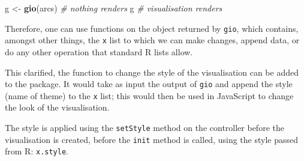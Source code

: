 \documentclass[10pt,]{krantz}
\makeatletter
\newenvironment{Shaded}{\begin{snugshade}}{\end{snugshade}}
\newcommand{\CommentTok}[1]{\textcolor[rgb]{0.37,0.37,0.37}{\textit{#1}}}
\newcommand{\ControlFlowTok}[1]{\textcolor[rgb]{0.27,0.27,0.27}{\textbf{#1}}}
\newcommand{\DataTypeTok}[1]{\textcolor[rgb]{0.27,0.27,0.27}{#1}}
\newcommand{\KeywordTok}[1]{\textcolor[rgb]{0.27,0.27,0.27}{\textbf{#1}}}
\newcommand{\NormalTok}[1]{#1}
\newcommand{\OperatorTok}[1]{\textcolor[rgb]{0.43,0.43,0.43}{\textbf{#1}}}
\newcommand{\StringTok}[1]{\textcolor[rgb]{0.5,0.5,0.5}{#1}}
\newenvironment{kframe}{%
\medskip{}
\setlength{\fboxsep}{.8em}
 \def\at@end@of@kframe{}%
 \ifinner\ifhmode%
  \def\at@end@of@kframe{\end{minipage}}%
  \begin{minipage}{\columnwidth}%
 \fi\fi%
 \def\FrameCommand##1{\hskip\@totalleftmargin \hskip-\fboxsep
 \colorbox{shadecolor}{##1}\hskip-\fboxsep
     \hskip-\linewidth \hskip-\@totalleftmargin \hskip\columnwidth}%
 \MakeFramed {\advance\hsize-\width
   \@totalleftmargin\z@ \linewidth\hsize
   \@setminipage}}%
 {\par\unskip\endMakeFramed%
 \at@end@of@kframe}
\renewenvironment{Shaded}{\begin{kframe}}{\end{kframe}}
\makeatother
\begin{document}
\begin{Shaded}
\begin{Highlighting}[]
\NormalTok{g <-}\StringTok{ }\KeywordTok{gio}\NormalTok{(arcs) }\CommentTok{# nothing renders}
\NormalTok{g }\CommentTok{# visualisation renders}
\end{Highlighting}
\end{Shaded}

Therefore, one can use functions on the object returned by \texttt{gio}, which contains, amongst other things, the \texttt{x} list to which we can make changes, append data, or do any other operation that standard R lists allow.

\begin{Shaded}
\end{Shaded}

This clarified, the function to change the style of the visualisation can be added to the package. It would take as input the output of \texttt{gio} and append the style (name of theme) to the \texttt{x} list; this would then be used in JavaScript to change the look of the visualisation.

\begin{Shaded}
\end{Shaded}

The style is applied using the \texttt{setStyle} method on the controller before the visualisation is created, before the \texttt{init} method is called, using the style passed from R: \texttt{x.style}.
\end{document}
